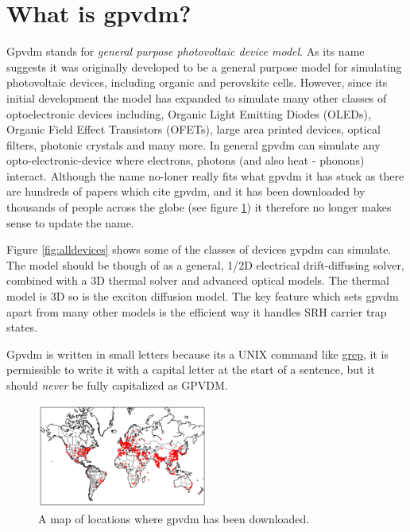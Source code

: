 \section{What is gpvdm?} 
Gpvdm stands for \emph{general purpose photovoltaic device model}.  As its name suggests it was originally developed to be a general purpose model for simulating photovoltaic devices, including organic and perovskite cells. However, since its initial development the model has expanded to simulate many other classes of optoelectronic devices including, Organic Light Emitting Diodes (OLEDs), Organic Field Effect Transistors (OFETs), large area printed devices, optical filters, photonic crystals and many more.  In general gpvdm can simulate any opto-electronic-device where electrons, photons (and also heat - phonons) interact.  Although the name no-loner really fits what gpvdm it has stuck as there are hundreds of papers which cite gpvdm, and it has been downloaded by thousands of people across the globe (see figure \ref{fig:downloadmap}) it therefore no longer makes sense to update the name.

Figure \ref{fig:alldevices} shows some of the classes of devices gvpdm can simulate. The model should be though of as a general, 1/2D electrical drift-diffusing solver, combined with a 3D thermal solver and advanced optical models.  The thermal model is 3D so is the exciton diffusion model.  The key feature which sets gpvdm apart from many other models is the efficient way it handles SRH carrier trap states. 

Gpvdm is written in small letters because its a UNIX command like \href{https://en.wikipedia.org/wiki/Grep}{grep}, it is permissible to write it with a capital letter at the start of a sentence, but it should \emph{never} be fully capitalized as GPVDM.



\begin{figure}
\centering
\includegraphics[width=0.5\textwidth]{./images/map.png}
\caption{A map of locations where gpvdm has been downloaded.}
\label{fig:downloadmap}
\end{figure}

